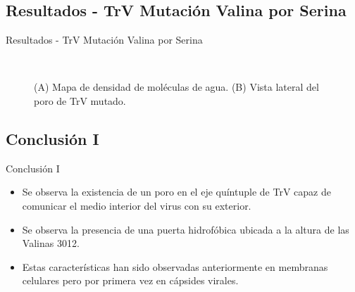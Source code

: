 \documentclass[8pt]{beamer}
\begin{document}
\subsection{Resultados - TrV Mutación Valina por Serina}
\begin{frame}[t]{Resultados - TrV Mutación Valina por Serina}

\begin{figure}[ht]
  \centering
  \vspace{-0.25cm}
      \\
  \caption*{ (A) Mapa de densidad de moléculas de agua. (B) Vista lateral del poro de TrV mutado.}%
\end{figure}

\end{frame}

\subsection{Conclusión I}
\begin{frame}{Conclusión I}
\begin{itemize}
    \item Se observa la \alert{existencia de un poro en el eje quíntuple de TrV} capaz de comunicar el medio interior del virus con su exterior.\vfill
    \item Se observa la presencia de una \alert{puerta hidrofóbica} ubicada a la altura de las Valinas 3012.\vfill
    \item Estas características han sido observadas anteriormente en membranas celulares pero por \alert{primera vez en cápsides virales}.
\end{itemize}
\end{frame}
\end{document}
